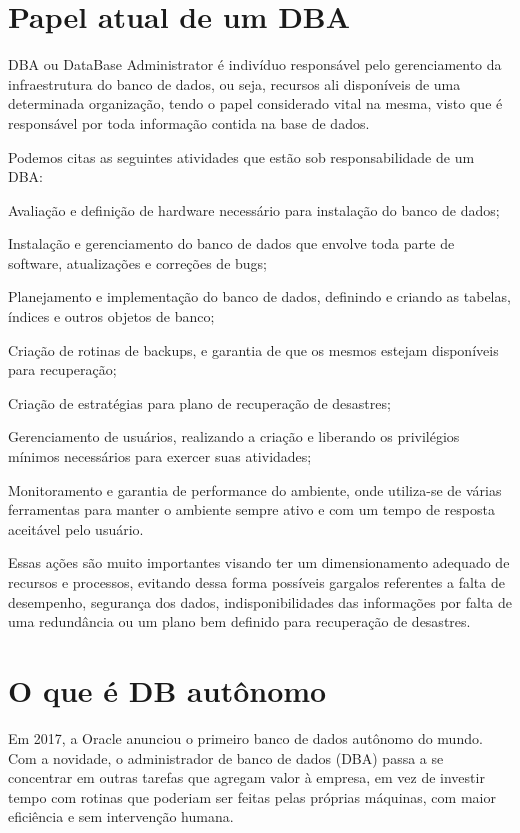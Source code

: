 \section{Papel atual de um DBA}

DBA ou DataBase Administrator é indivíduo responsável pelo gerenciamento da infraestrutura do banco de dados, ou seja, recursos ali disponíveis de uma determinada organização, tendo o papel considerado vital na mesma, visto que é responsável por toda informação contida na base de dados.


Podemos citas as seguintes atividades que estão sob responsabilidade de um DBA:
\begin{alineas}
\item Avaliação e definição de hardware necessário para instalação do banco de dados;
\item Instalação e gerenciamento do banco de dados que envolve toda parte de software, atualizações e correções de bugs;
\item Planejamento e implementação do banco de dados, definindo e criando as tabelas, índices e outros objetos de banco;	
\item Criação de rotinas de backups, e garantia de que os mesmos estejam disponíveis para recuperação;
\item Criação de estratégias para plano de recuperação de desastres;
\item Gerenciamento de usuários, realizando a criação e liberando os privilégios mínimos necessários para exercer suas atividades;
\item Monitoramento e garantia de performance do ambiente, onde utiliza-se de várias ferramentas para manter o ambiente sempre ativo e com um tempo de resposta aceitável pelo usuário.
\end{alineas} 

Essas ações são muito importantes visando ter um dimensionamento adequado de recursos e processos, evitando dessa forma possíveis gargalos referentes a falta de desempenho, segurança dos dados, indisponibilidades das informações por falta de uma redundância ou um plano bem definido para recuperação de desastres.


\section{O que é DB autônomo}

\begin{citacao}
Em 2017, a Oracle anunciou o primeiro banco de dados autônomo do mundo. Com a novidade, o administrador de banco de dados (DBA) passa a se concentrar em outras tarefas que agregam valor à empresa, em vez de investir tempo com rotinas que poderiam ser feitas pelas próprias máquinas, com maior eficiência e sem intervenção humana.\cite[p. ~34]{TecnoBlog}
\end{citacao}

